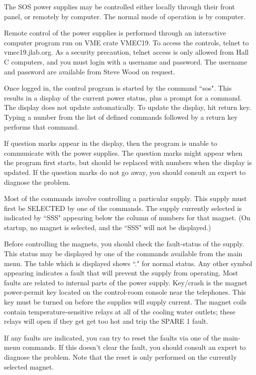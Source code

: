 The SOS power supplies may be controlled either locally through their front
panel, or remotely by computer. The normal mode of operation is by computer.

Remote control of the power supplies is performed through an interactive
computer program run on VME crate VMEC19. To access the controls, telnet to
vmec19.jlab.org. As a security precaution, telnet access is only allowed
from Hall C computers, and you must login with a username and
password.  The username and password are available
from Steve Wood on request.

Once logged in, the control program is started by the command ``sos".  This
results in a display of the current power status, plus a prompt for a
command. The display does not update automatically.  To update the
display, hit return key.  Typing a number from the list of defined
commands followed by a return key performs that command.

If question marks appear in the display, then the program is unable to
communicate with the power supplies. The question marks might appear when
the program first starts, but should be replaced with numbers when the
display is updated.  If the question marks do not go away, you should
consult an expert to diagnose the problem.

Most of the commands involve controlling a particular supply. This supply must
first be SELECTED by one of the commands. The supply currently selected is
indicated by ``SSS" appearing below the column of numbers for that magnet. (On
startup, no magnet is selected, and the ``SSS" will not be displayed.)

Before controlling the magnets, you should check the fault-status of the supply.
This status may be displayed by one of the commands available from the main
menu. The table which is displayed shows ``." for normal status. Any other symbol
appearing indicates a fault that will prevent the supply from operating. Most
faults are related to internal parts of the power supply. Key/crash is the
magnet power-permit key located on the control-room console near the telephones.
This key must be turned on before the supplies will supply current. The magnet
coils contain temperature-sensitive relays at all of the cooling water outlets;
these relays will open if they get get too hot and trip the SPARE 1 fault.

If any faults are indicated, you can try to reset the faults via one of the
main-menu commands. If this doesn't clear the fault, you should consult an
expert to diagnose the problem. Note that the reset is only performed on the
currently selected magnet.

